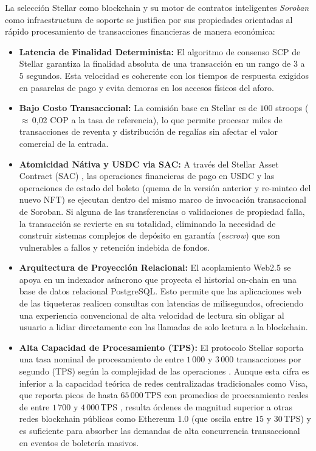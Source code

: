 La selección Stellar como blockchain y su motor de contratos inteligentes \textit{Soroban} como
infraestructura de soporte se justifica 
por sus propiedades orientadas al rápido procesamiento de transacciones financieras de manera económica:
\begin{itemize}
    \item \textbf{Latencia de Finalidad Determinista:} El algoritmo de consenso SCP de Stellar
\cite{mazieres2015stellar} 
    garantiza la finalidad absoluta de una transacción en un rango de $3$ a $5$ segundos. Esta velocidad es
coherente 
    con los tiempos de respuesta exigidos en pasarelas de pago y evita demoras en los accesos físicos del
aforo.

    \item \textbf{Bajo Costo Transaccional:} La comisión base en Stellar es de $100$ stroops
($\approx$\,0{,}02 COP a 
    la tasa de referencia), lo que permite procesar miles de transacciones de reventa y distribución de
regalías sin afectar
    el valor comercial de la entrada.

    \item \textbf{Atomicidad Nátiva y USDC via SAC:} A través del Stellar Asset Contract (SAC)
\cite{sdf2024sep41}, las 
    operaciones financieras de pago en USDC y las operaciones de estado del boleto (quema de la versión
anterior y 
    re-minteo del nuevo NFT) se ejecutan dentro del mismo marco de invocación transaccional de Soroban. Si
alguna de las 
    transferencias o validaciones de propiedad falla, la transacción se revierte en su totalidad, eliminando
la necesidad 
    de construir sistemas complejos de depósito en garantía (\textit{escrow}) que son vulnerables a fallos y
retención 
    indebida de fondos.

    \item \textbf{Arquitectura de Proyección Relacional:} El acoplamiento Web2.5 se apoya en un indexador
asíncrono que proyecta
     el historial on-chain en una base de datos relacional PostgreSQL. Esto permite que las aplicaciones web
de las tiqueteras 
     realicen consultas con latencias de milisegundos, ofreciendo una experiencia convencional de alta
velocidad de lectura sin 
     obligar al usuario a lidiar directamente con las llamadas de solo lectura a la blockchain.

    \item \textbf{Alta Capacidad de Procesamiento (TPS):} El protocolo Stellar soporta una tasa nominal de
procesamiento de 
    entre $1\,000$ y $3\,000$ transacciones por segundo (TPS) según la complejidad de las operaciones
\cite{binance2024stellar}. 
    Aunque esta cifra es inferior a la capacidad teórica de redes centralizadas tradicionales como Visa, que
reporta picos de 
    hasta $65\,000$\,TPS con promedios de procesamiento reales de entre $1\,700$ y $4\,000$\,TPS
\cite{visa2024tps}, 
    resulta órdenes de magnitud superior a otras redes blockchain públicas como Ethereum 1.0 (que oscila
entre $15$ y $30$\,TPS) 
    y es suficiente para absorber las demandas de alta concurrencia transaccional en eventos de boletería
masivos.

\end{itemize}

